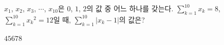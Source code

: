 \hspace*{2mm}\begin{minipage}[t]{\dimexpr\linewidth-2mm\relax}\vspace{0pt}
$x_1$, $x_2$, $x_3$, $\cdots$, $x_{10}$은 $0$, $1$, $2$의 값 중 어느 하나를 갖는다. $\displaystyle\sum_{k=1}^{10}x_k=8$, $\displaystyle\sum_{k=1}^{10}{x_k}^2=12$일 때, $\displaystyle\sum_{k=1}^{10}|x_k-1|$의 값은?
\begin{choices32}{$4$}{$5$}{$6$}{$7$}{$8$}\end{choices32}\end{minipage}
